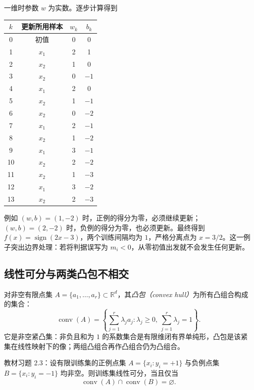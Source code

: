 \begin{solve}
一维时参数 $w$ 为实数。逐步计算得到
\begin{center}
\begin{tabular}{cccc}
\toprule
$k$ & 更新所用样本 & $w_k$ & $b_k$ \\
\midrule
0 & 初值 & 0 & 0 \\
1 & $x_1$ & 2 & 1 \\
2 & $x_2$ & 1 & 0 \\
3 & $x_2$ & 0 & $-1$ \\
4 & $x_1$ & 2 & 0 \\
5 & $x_2$ & 1 & $-1$ \\
6 & $x_2$ & 0 & $-2$ \\
7 & $x_1$ & 2 & $-1$ \\
8 & $x_2$ & 1 & $-2$ \\
9 & $x_1$ & 3 & $-1$ \\
10 & $x_2$ & 2 & $-2$ \\
11 & $x_2$ & 1 & $-3$ \\
12 & $x_1$ & 3 & $-2$ \\
13 & $x_2$ & 2 & $-3$ \\
\bottomrule
\end{tabular}
\end{center}
例如 $(w,b)=(1,-2)$ 时，正例的得分为零，必须继续更新；$(w,b)=(2,-2)$ 时，负例的得分为零，也必须更新。最终得到 $f(x)=\operatorname{sign}(2x-3)$，两个训练间隔均为 $1$，严格分离点为 $x=3/2$。这一例子突出边界处理：若将判据误写为 $m_i<0$，从零初值出发就不会发生任何更新。
\end{solve}

\subsection{线性可分与两类凸包不相交}
\label{subsec:lh-perceptron-convex-hulls}

\begin{definition}[有限点集的凸包]
\label{def:lh-perceptron-convex-hull}
对非空有限点集 $A=\{a_1,\ldots,a_r\}\subset\mathbb R^d$，其\emph{凸包（convex hull）}为所有凸组合构成的集合：
\[
\operatorname{conv}(A)=
\left\{\sum_{j=1}^{r}\lambda_j a_j:
\lambda_j\geq0,\ \sum_{j=1}^{r}\lambda_j=1\right\}.
\]
它是非空紧凸集：非负且和为 $1$ 的系数集合是有限维闭有界单纯形，凸包是该紧集在线性映射下的像；两组凸组合再作凸组合仍为凸组合。
\end{definition}

\begin{theorem}[两类凸包判据]
\label{thm:lh-perceptron-convex-hulls}
教材习题 2.3：设有限训练集的正例点集 $A=\{x_i:y_i=+1\}$ 与负例点集 $B=\{x_i:y_i=-1\}$ 均非空。则训练集线性可分，当且仅当
\begin{equation}
\label{eq:lh-perceptron-disjoint-hulls}
\operatorname{conv}(A)\cap\operatorname{conv}(B)=\varnothing.
\end{equation}
\end{theorem}

